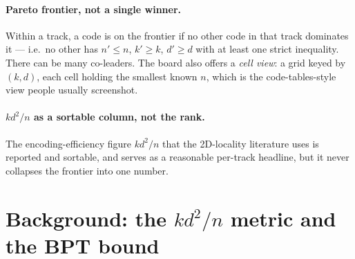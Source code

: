 \documentclass[11pt]{article}
\newcommand{\eff}{kd^2/n}
\begin{document}
	\paragraph{Pareto frontier, not a single winner.} Within a track, a code is
	on the frontier if no other code in that track dominates it --- i.e.\ no
	other has $n'\le n$, $k'\ge k$, $d'\ge d$ with at least one strict
	inequality. There can be many co-leaders. The board also offers a
	\emph{cell view}: a grid keyed by $(k,d)$, each cell holding the smallest
	known $n$, which is the code-tables-style view people usually screenshot.

	\paragraph{$\eff$ as a sortable column, not the rank.} The
	encoding-efficiency figure $\eff$ that the 2D-locality literature uses is
	reported and sortable, and serves as a reasonable per-track headline, but
	it never collapses the frontier into one number.

	\section{Background: the $\eff$ metric and the BPT bound}
\end{document}
